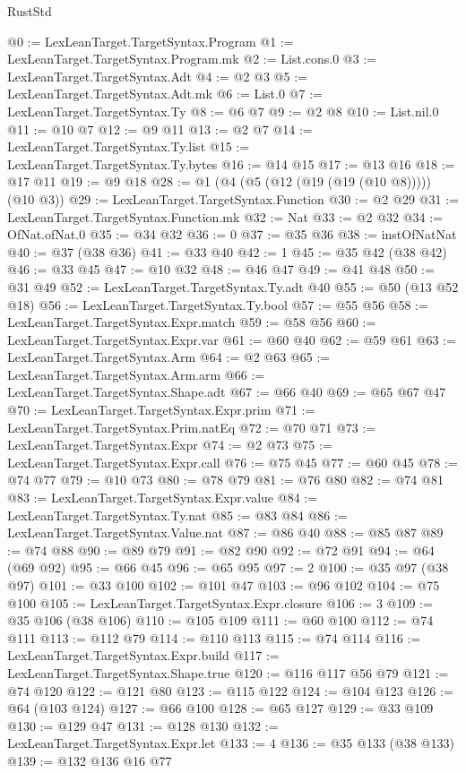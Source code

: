 \begin{lexlean}{RustStd}
\begin{coremodule}
@0 := LexLeanTarget.TargetSyntax.Program
@1 := LexLeanTarget.TargetSyntax.Program.mk
@2 := List.cons.{0}
@3 := LexLeanTarget.TargetSyntax.Adt
@4 := @2 @3
@5 := LexLeanTarget.TargetSyntax.Adt.mk
@6 := List.{0}
@7 := LexLeanTarget.TargetSyntax.Ty
@8 := @6 @7
@9 := @2 @8
@10 := List.nil.{0}
@11 := @10 @7
@12 := @9 @11
@13 := @2 @7
@14 := LexLeanTarget.TargetSyntax.Ty.list
@15 := LexLeanTarget.TargetSyntax.Ty.bytes
@16 := @14 @15
@17 := @13 @16
@18 := @17 @11
@19 := @9 @18
@28 := @1 (@4 (@5 (@12 (@19 (@19 (@10 @8))))) (@10 @3))
@29 := LexLeanTarget.TargetSyntax.Function
@30 := @2 @29
@31 := LexLeanTarget.TargetSyntax.Function.mk
@32 := Nat
@33 := @2 @32
@34 := OfNat.ofNat.{0}
@35 := @34 @32
@36 := 0
@37 := @35 @36
@38 := instOfNatNat
@40 := @37 (@38 @36)
@41 := @33 @40
@42 := 1
@45 := @35 @42 (@38 @42)
@46 := @33 @45
@47 := @10 @32
@48 := @46 @47
@49 := @41 @48
@50 := @31 @49
@52 := LexLeanTarget.TargetSyntax.Ty.adt @40
@55 := @50 (@13 @52 @18)
@56 := LexLeanTarget.TargetSyntax.Ty.bool
@57 := @55 @56
@58 := LexLeanTarget.TargetSyntax.Expr.match
@59 := @58 @56
@60 := LexLeanTarget.TargetSyntax.Expr.var
@61 := @60 @40
@62 := @59 @61
@63 := LexLeanTarget.TargetSyntax.Arm
@64 := @2 @63
@65 := LexLeanTarget.TargetSyntax.Arm.arm
@66 := LexLeanTarget.TargetSyntax.Shape.adt
@67 := @66 @40
@69 := @65 @67 @47
@70 := LexLeanTarget.TargetSyntax.Expr.prim
@71 := LexLeanTarget.TargetSyntax.Prim.natEq
@72 := @70 @71
@73 := LexLeanTarget.TargetSyntax.Expr
@74 := @2 @73
@75 := LexLeanTarget.TargetSyntax.Expr.call
@76 := @75 @45
@77 := @60 @45
@78 := @74 @77
@79 := @10 @73
@80 := @78 @79
@81 := @76 @80
@82 := @74 @81
@83 := LexLeanTarget.TargetSyntax.Expr.value
@84 := LexLeanTarget.TargetSyntax.Ty.nat
@85 := @83 @84
@86 := LexLeanTarget.TargetSyntax.Value.nat
@87 := @86 @40
@88 := @85 @87
@89 := @74 @88
@90 := @89 @79
@91 := @82 @90
@92 := @72 @91
@94 := @64 (@69 @92)
@95 := @66 @45
@96 := @65 @95
@97 := 2
@100 := @35 @97 (@38 @97)
@101 := @33 @100
@102 := @101 @47
@103 := @96 @102
@104 := @75 @100
@105 := LexLeanTarget.TargetSyntax.Expr.closure
@106 := 3
@109 := @35 @106 (@38 @106)
@110 := @105 @109
@111 := @60 @100
@112 := @74 @111
@113 := @112 @79
@114 := @110 @113
@115 := @74 @114
@116 := LexLeanTarget.TargetSyntax.Expr.build
@117 := LexLeanTarget.TargetSyntax.Shape.true
@120 := @116 @117 @56 @79
@121 := @74 @120
@122 := @121 @80
@123 := @115 @122
@124 := @104 @123
@126 := @64 (@103 @124)
@127 := @66 @100
@128 := @65 @127
@129 := @33 @109
@130 := @129 @47
@131 := @128 @130
@132 := LexLeanTarget.TargetSyntax.Expr.let
@133 := 4
@136 := @35 @133 (@38 @133)
@139 := @132 @136 @16 @77

\end{coremodule}
\end{lexlean}
